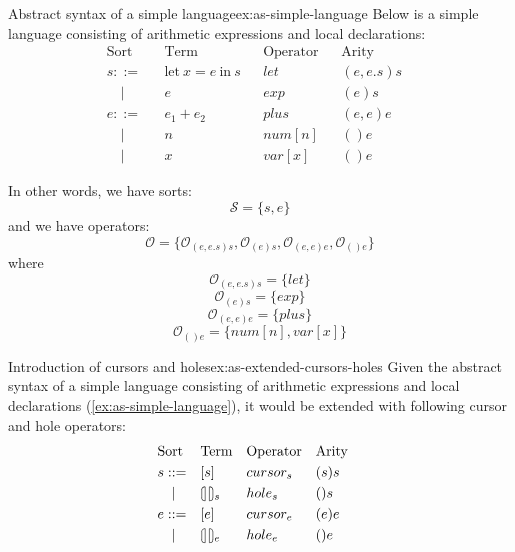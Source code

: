 \begin{example}{Abstract syntax of a simple language}{ex:as-simple-language}
    Below is a simple language consisting of arithmetic expressions and local declarations:
    \[
        \begin{aligned}
             & \text{Sort} &  & \text{Term}                        &  & \text{Operator} &  & \text{Arity} &  & \\
             & s ::=       &  & \text{let} \ x = e \ \text{in} \ s &  & let             &  & (e,e.s)s     &  & \\
             & \quad |     &  & e                                  &  & exp             &  & (e)s         &  & \\
             & e ::=       &  & e_1 + e_2                          &  & plus            &  & (e,e)e       &  & \\
             & \quad |     &  & n                                  &  & num[n]          &  & ()e          &  & \\
             & \quad |     &  & x                                  &  & var[x]          &  & ()e
        \end{aligned}
    \]

    In other words, we have sorts: $$\mathcal{S} = \{ s, e \}$$ and we have operators: $$\mathcal{O} = \{
        \mathcal{O}_{(e,e.s)s}, \mathcal{O}_{(e)s}, \mathcal{O}_{(e,e)e}, \mathcal{O}_{()e}\}$$ where $$\mathcal{O}_{(e,e.s)s} = \{ let \}$$ $$\mathcal{O}_{(e)s} = \{ exp \}$$ $$\mathcal{O}_{(e,e)e} = \{ plus \}$$ $$\mathcal{O}_{()e} = \{ num[n], var[x] \}$$

\end{example}

\begin{example}{Introduction of cursors and holes}{ex:as-extended-cursors-holes}
    Given the abstract syntax of a simple language consisting of arithmetic expressions and local declarations (\cref{ex:as-simple-language}), it would be extended with following cursor and hole operators:
    \[
        \begin{aligned}
             & \text{Sort} &  & \text{Term} &  & \text{Operator} &  & \text{Arity} &  & \\
             & s ::=       &  & [s]         &  & cursor_s        &  & (s)s         &  & \\
             & \quad |     &  & \hole_s     &  & hole_s          &  & ()s          &  & \\
             & e ::=       &  & [e]         &  & cursor_e        &  & (e)e         &  & \\
             & \quad |     &  & \hole_e     &  & hole_e          &  & ()e
        \end{aligned}
    \]
\end{example}

